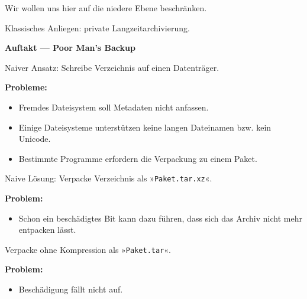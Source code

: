 \documentclass{beamer}
\newcommand{\strong}[1]{\textsf{\textbf{#1}}}
\begin{document}
\begin{frame}
Wir wollen uns hier auf die niedere Ebene beschränken.\pause

\vspace{1em}
Klassisches Anliegen: private Langzeitarchivierung.
\end{frame}

\begin{frame}
\begin{center}
\strong{Auftakt --- Poor Man's Backup}
\end{center}
\end{frame}

\begin{frame}[t]
\vspace{2em}
Naiver Ansatz: Schreibe Verzeichnis auf einen Datenträger.\pause

\vspace{1em}
\strong{Probleme:}
\begin{itemize}
\item Fremdes Dateisystem soll Metadaten nicht anfassen.
\item Einige Dateisysteme unterstützen keine langen Dateinamen
  bzw. kein Unicode.
\item Bestimmte Programme erfordern die Verpackung zu einem Paket.
\end{itemize}
\end{frame}

\begin{frame}[t]
\vspace{2em}
Naive Lösung: Verpacke Verzeichnis als »\texttt{Paket.tar.xz}«.\pause

\vspace{2em}
\strong{Problem:}
\begin{itemize}
\item Schon ein beschädigtes Bit kann dazu führen, dass sich
  das Archiv nicht mehr entpacken lässt.
\end{itemize}
\end{frame}

\begin{frame}[t]
\vspace{2em}
Verpacke ohne Kompression als »\texttt{Paket.tar}«.\pause

\vspace{2em}
\strong{Problem:}
\begin{itemize}
\item Beschädigung fällt nicht auf.
\end{itemize}
\end{frame}
\end{document}
